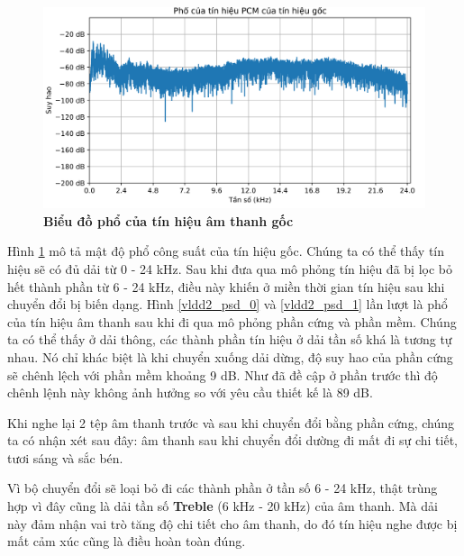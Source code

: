 \begin{figure}[H]
    \centering
    \includegraphics[width=14cm]{Images/Chuong4/tb/wav/vldd2_psd_2.png}
    \caption[Biểu đồ phổ của tín hiệu âm thanh gốc]{\bfseries \fontsize{12pt}{0pt}\selectfont Biểu đồ phổ của tín hiệu âm thanh gốc}
    \label{vldd2_psd_2}
\end{figure}

Hình \ref{vldd2_psd_2} mô tả mật độ phổ công suất của tín hiệu gốc. Chúng ta có thể thấy tín hiệu sẽ có đủ dải từ 0 - 24 kHz. Sau khi đưa qua mô phỏng tín hiệu đã bị lọc bỏ hết thành phần từ 6 - 24 kHz, điều này khiến ở miền thời gian tín hiệu sau khi chuyển đổi bị biến dạng. Hình \ref{vldd2_psd_0} và \ref{vldd2_psd_1} lần lượt là phổ của tín hiệu âm thanh sau khi đi qua mô phỏng phần cứng và phần mềm. Chúng ta có thể thấy ở dải thông, các thành phần tín hiệu ở dải tần số khá là tương tự nhau. Nó chỉ khác biệt là khi chuyển xuống dải dừng, độ suy hao của phần cứng sẽ chênh lệch với phần mềm khoảng 9 dB. Như đã đề cập ở phần trước thì độ chênh lệnh này không ảnh hưởng so với yêu cầu thiết kế là 89 dB.

Khi nghe lại 2 tệp âm thanh trước và sau khi chuyển đổi bằng phần cứng, chúng ta có nhận xét sau đây: âm thanh sau khi chuyển đổi dường đi mất đi sự chi tiết, tươi sáng và sắc bén. 

Vì bộ chuyển đổi sẽ loại bỏ đi các thành phần ở tần số 6 - 24 kHz, thật trùng hợp vì đây cũng là dải tần số \textbf{Treble} (6 kHz - 20 kHz) của âm thanh. Mà dải này đảm nhận vai trò tăng độ chi tiết cho âm thanh, do đó tín hiệu nghe được bị mất cảm xúc cũng là điều hoàn toàn đúng.

